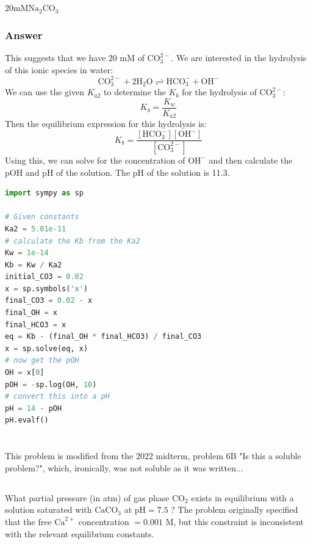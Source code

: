 \documentclass[12pt]{article}
\begin{document}
\subsection{}
$20 \mathrm{mM} \mathrm{Na}_{2} \mathrm{CO}_{3}$
\subsubsection{Answer}
This suggests that we have 20 mM of $\mathrm{CO}_{3}^{2-}$. We are interested in the hydrolysis of this ionic species in water:
\begin{equation}
\mathrm{CO}_{3}^{2-}+2 \mathrm{H}_{2} \mathrm{O} \rightleftharpoons \mathrm{HCO}_{3}^{-}+\mathrm{OH}^{-}
\end{equation}
We can use the given $K_{a2}$ to determine the $K_{b}$ for the hydrolysis of $\mathrm{CO}_{3}^{2-}$:
\begin{equation}
K_{b}=\frac{K_{w}}{K_{a2}}
\end{equation}
Then the equilibrium expression for this hydrolysis is:
\begin{equation}
K_{b}=\frac{[\mathrm{HCO}_{3}^{-}][\mathrm{OH}^{-}]}{[\mathrm{CO}_{3}^{2-}]}
\end{equation}
Using this, we can solve for the concentration of $\mathrm{OH}^{-}$ and then calculate the $\mathrm{pOH}$ and $\mathrm{pH}$ of the solution. The $\mathrm{pH}$ of the solution is 11.3.
\begin{lstlisting}[language=Python]
import sympy as sp

# Given constants
Ka2 = 5.01e-11
# calculate the Kb from the Ka2
Kw = 1e-14
Kb = Kw / Ka2
initial_CO3 = 0.02
x = sp.symbols('x')
final_CO3 = 0.02 - x
final_OH = x
final_HCO3 = x
eq = Kb - (final_OH * final_HCO3) / final_CO3
x = sp.solve(eq, x)
# now get the pOH
OH = x[0]
pOH = -sp.log(OH, 10)
# convert this into a pH
pH = 14 - pOH
pH.evalf()
\end{lstlisting}


\section{}
This problem is modified from the 2022 midterm, problem 6B "Is this a soluble problem?", which, ironically, was not soluble as it was written...

\subsection{}
What partial pressure (in atm) of gas phase $\mathrm{CO}_{2}$ exists in equilibrium with a solution saturated with $\mathrm{CaCO}_{3}$ at $\mathrm{pH}=7.5$ ? The problem originally specified that the free $\mathrm{Ca}^{2+}$ concentration $=0.001$ $\mathrm{M}$, but this constraint is inconsistent with the relevant equilibrium constants.
\end{document}
